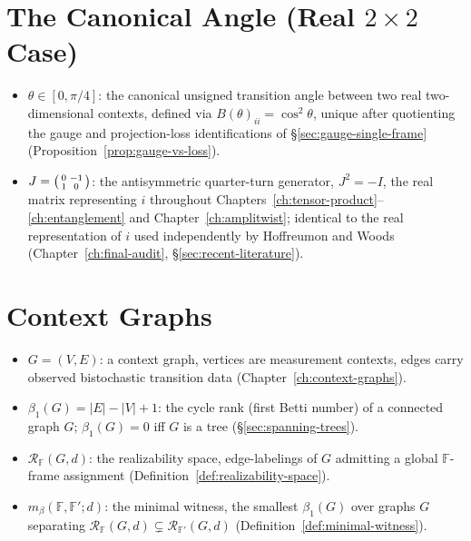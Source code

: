 \section{The Canonical Angle (Real \texorpdfstring{$2\times2$}{2x2} Case)}
\begin{itemize}
\item[] $\theta \in [0,\pi/4]$: the canonical unsigned transition angle
between two real two-dimensional contexts, defined via
$B(\theta)_{ii}=\cos^2\theta$, unique after quotienting the gauge and
projection-loss identifications of \S\ref{sec:gauge-single-frame}
(Proposition~\ref{prop:gauge-vs-loss}).
\item[] $J = \begin{psmallmatrix}0&-1\\1&0\end{psmallmatrix}$: the
antisymmetric quarter-turn generator, $J^2=-I$, the real matrix
representing $i$ throughout Chapters~\ref{ch:tensor-product}--
\ref{ch:entanglement} and Chapter~\ref{ch:amplitwist}; identical to the
real representation of $i$ used independently by
Hoffreumon and Woods~\cite{hoffreumon-woods-2025}
(Chapter~\ref{ch:final-audit}, \S\ref{sec:recent-literature}).
\end{itemize}

\section{Context Graphs}
\begin{itemize}
\item[] $G=(V,E)$: a context graph, vertices are measurement contexts,
edges carry observed bistochastic transition data
(Chapter~\ref{ch:context-graphs}).
\item[] $\beta_1(G) = |E|-|V|+1$: the cycle rank (first Betti number) of a
connected graph $G$; $\beta_1(G)=0$ iff $G$ is a tree
(\S\ref{sec:spanning-trees}).
\item[] $\mathcal R_{\mathbb F}(G,d)$: the realizability space, edge-labelings
of $G$ admitting a global $\mathbb F$-frame assignment
(Definition~\ref{def:realizability-space}).
\item[] $m_\beta(\mathbb F,\mathbb F';d)$: the minimal witness, the smallest
$\beta_1(G)$ over graphs $G$ separating $\mathcal R_{\mathbb F}(G,d)
\subsetneq \mathcal R_{\mathbb F'}(G,d)$ (Definition~\ref{def:minimal-witness}).
\end{itemize}

